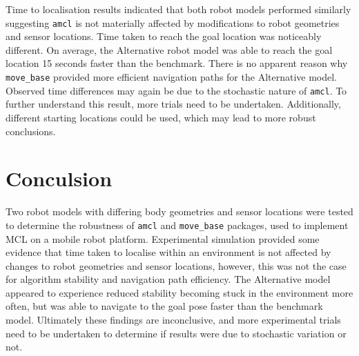 \documentclass[a4paper]{article}
\begin{document}
Time to localisation results indicated that both robot models performed similarly suggesting \texttt{amcl} is not materially affected by modifications to robot geometries and sensor locations. Time taken to reach the goal location was noticeably different. On average, the Alternative robot model was able to reach the goal location 15 seconds faster than the benchmark. There is no apparent reason why \texttt{move\_base} provided more efficient navigation paths for the Alternative model. Observed time differences may again be due to the stochastic nature of \texttt{amcl}. To further understand this result, more trials need to be undertaken. Additionally, different starting locations could be used, which may lead to more robust conclusions.


\section{Conculsion}
Two robot models with differing body geometries and sensor locations were tested to determine the robustness of \texttt{amcl} and \texttt{move\_base} packages, used to implement MCL on a mobile robot platform. Experimental simulation provided some evidence that time taken to localise within an environment is not affected by changes to robot geometries and sensor locations, however, this was not the case for algorithm stability and navigation path efficiency. The Alternative model appeared to experience reduced stability becoming stuck in the environment more often, but was able to navigate to the goal pose faster than the benchmark model. Ultimately these findings are inconclusive, and more experimental trials need to be undertaken to determine if results were due to stochastic variation or not.




\end{document}
